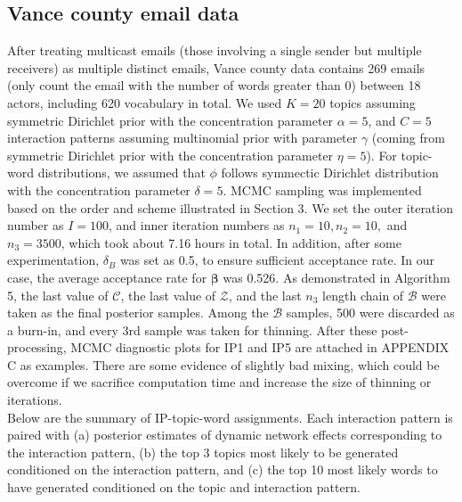 \documentclass[a4paper]{article}
\begin{document}
\subsection{Vance county email data}
After treating multicast emails (those involving a single sender but multiple receivers) as multiple distinct emails, Vance county data contains 269 emails (only count the email with the number of words greater than 0) between 18 actors, including 620 vocabulary in total. We used $K=20$ topics assuming symmetric Dirichlet prior with the concentration parameter $\alpha=5$, and $C=5$ interaction patterns assuming multinomial prior with parameter $\gamma$ (coming from symmetric Dirichlet prior with the concentration parameter $\eta = 5$). For topic-word distributions, we assumed that $\phi$ follows symmectic Dirichlet distribution with the concentration parameter $\delta=5$. MCMC sampling was implemented based on the order and scheme illustrated in Section 3. We set the outer iteration number as $I=100$, and inner iteration numbers as $n_1=10, n_2=10,$ and $n_3=3500$, which took about 7.16 hours in total. In addition, after some experimentation, $\delta_B$ was set as 0.5, to ensure sufficient acceptance rate. In our case, the average acceptance rate for $\boldsymbol{\beta}$ was 0.526. As demonstrated in Algorithm 5, the last value of $\mathcal{C}$, the last value of $\mathcal{Z}$, and the last $n_3$ length chain of $\mathcal{B}$ were taken as the final posterior samples. Among the $\mathcal{B}$ samples, 500 were discarded as a burn-in, and every 3rd sample was taken for thinning. After these post-processing, MCMC diagnostic plots for IP1 and IP5 are attached in APPENDIX C as examples. There are some evidence of slightly bad mixing, which could be overcome if we sacrifice computation time and increase the size of thinning or iterations. \\\newline
Below are the summary of IP-topic-word assignments. Each interaction pattern is paired with (a) posterior estimates of dynamic network effects corresponding to the interaction pattern, (b) the top 3 topics most likely to be generated conditioned on the interaction pattern, and (c) the top 10 most likely words to have generated conditioned on the topic and interaction pattern.
\footnotesize
\end{document}
